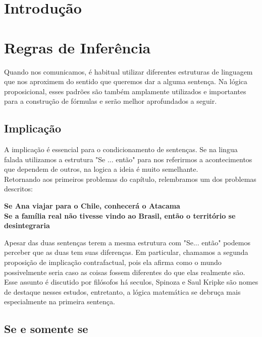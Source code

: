 \section{Introdução}

\section{Regras de Inferência}
Quando nos comunicamos, é habitual utilizar diferentes estruturas de linguagem que nos aproximem do sentido que queremos dar a alguma sentença. Na lógica proposicional, esses padrões são também amplamente utilizados e importantes para a construção de fórmulas e serão melhor aprofundados a seguir.

\subsection{Implicação} 
A implicação é essencial para o condicionamento de sentenças. Se na lingua falada utilizamos a estrutura "Se ... então" para nos referirmos a acontecimentos que dependem de outros, na logica a ideia é muito semelhante.\\
Retornando aos primeiros problemas do capítulo, relembramos um dos problemas descritos:
\begin{center}
\textbf{Se Ana viajar para o Chile, conhecerá o Atacama}\\
\textbf{Se a família real não tivesse vindo ao Brasil, então o território se desintegraria}
\end{center}
Apesar das duas sentenças terem a mesma estrutura com "Se... então" podemos perceber que as duas tem suas diferenças. Em particular, chamamos a segunda proposição de implicação contrafactual, pois ela afirma como o mundo possivelmente seria caso as coisas fossem diferentes do que elas realmente são. Esse assunto é discutido por filósofos há seculos, Spinoza e Saul Kripke são nomes de destaque nesses estudos, entretanto, a lógica matemática se debruça mais especialmente na primeira sentença.
\subsection{Se e somente se}

